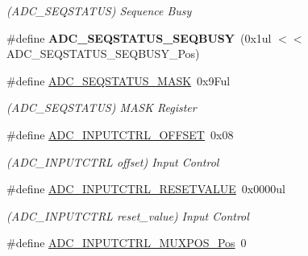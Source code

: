 \begin{DoxyCompactItemize}
\begin{DoxyCompactList}\small\item\em (A\+D\+C\+\_\+\+S\+E\+Q\+S\+T\+A\+T\+U\+S) Sequence Busy \end{DoxyCompactList}\item 
\hypertarget{group___s_a_m_l21___a_d_c_gacc9d9b0433a02473a4de123378245196}{}\#define {\bfseries A\+D\+C\+\_\+\+S\+E\+Q\+S\+T\+A\+T\+U\+S\+\_\+\+S\+E\+Q\+B\+U\+S\+Y}~(0x1ul $<$$<$ A\+D\+C\+\_\+\+S\+E\+Q\+S\+T\+A\+T\+U\+S\+\_\+\+S\+E\+Q\+B\+U\+S\+Y\+\_\+\+Pos)\label{group___s_a_m_l21___a_d_c_gacc9d9b0433a02473a4de123378245196}

\item 
\hypertarget{group___s_a_m_l21___a_d_c_gae5f3b35d16ed29bd15a6acc862bce7d8}{}\#define \hyperlink{group___s_a_m_l21___a_d_c_gae5f3b35d16ed29bd15a6acc862bce7d8}{A\+D\+C\+\_\+\+S\+E\+Q\+S\+T\+A\+T\+U\+S\+\_\+\+M\+A\+S\+K}~0x9\+Ful\label{group___s_a_m_l21___a_d_c_gae5f3b35d16ed29bd15a6acc862bce7d8}

\begin{DoxyCompactList}\small\item\em (A\+D\+C\+\_\+\+S\+E\+Q\+S\+T\+A\+T\+U\+S) M\+A\+S\+K Register \end{DoxyCompactList}\item 
\hypertarget{group___s_a_m_l21___a_d_c_ga9692ff2e0c84bb47a64ed6704defc86c}{}\#define \hyperlink{group___s_a_m_l21___a_d_c_ga9692ff2e0c84bb47a64ed6704defc86c}{A\+D\+C\+\_\+\+I\+N\+P\+U\+T\+C\+T\+R\+L\+\_\+\+O\+F\+F\+S\+E\+T}~0x08\label{group___s_a_m_l21___a_d_c_ga9692ff2e0c84bb47a64ed6704defc86c}

\begin{DoxyCompactList}\small\item\em (A\+D\+C\+\_\+\+I\+N\+P\+U\+T\+C\+T\+R\+L offset) Input Control \end{DoxyCompactList}\item 
\hypertarget{group___s_a_m_l21___a_d_c_ga91cf2e939a7345b5a26ff492a176f647}{}\#define \hyperlink{group___s_a_m_l21___a_d_c_ga91cf2e939a7345b5a26ff492a176f647}{A\+D\+C\+\_\+\+I\+N\+P\+U\+T\+C\+T\+R\+L\+\_\+\+R\+E\+S\+E\+T\+V\+A\+L\+U\+E}~0x0000ul\label{group___s_a_m_l21___a_d_c_ga91cf2e939a7345b5a26ff492a176f647}

\begin{DoxyCompactList}\small\item\em (A\+D\+C\+\_\+\+I\+N\+P\+U\+T\+C\+T\+R\+L reset\+\_\+value) Input Control \end{DoxyCompactList}\item 
\hypertarget{group___s_a_m_l21___a_d_c_ga583868be285e1c06c9a93dfd552d8c6a}{}\#define \hyperlink{group___s_a_m_l21___a_d_c_ga583868be285e1c06c9a93dfd552d8c6a}{A\+D\+C\+\_\+\+I\+N\+P\+U\+T\+C\+T\+R\+L\+\_\+\+M\+U\+X\+P\+O\+S\+\_\+\+Pos}~0\label{group___s_a_m_l21___a_d_c_ga583868be285e1c06c9a93dfd552d8c6a}


\end{DoxyCompactItemize}
